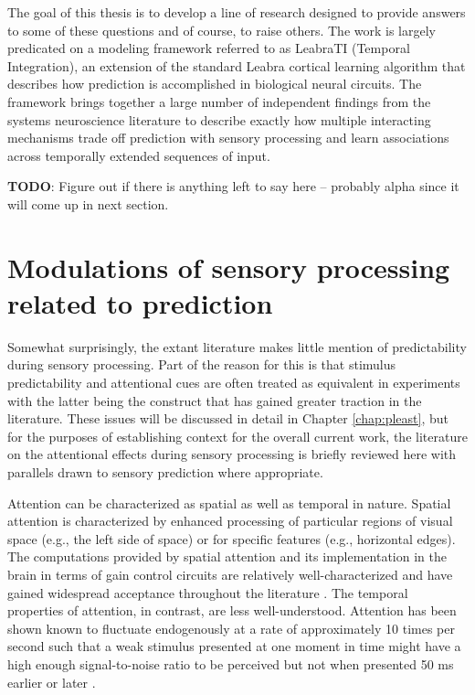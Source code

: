 \documentclass[dwyatte_dissertation.tex]{subfiles}
\begin{document}
{The goal of this thesis is to develop a line of research designed to provide answers to some of these questions and of course, to raise others. The work is largely predicated on a modeling framework referred to as LeabraTI (Temporal Integration), an extension of the standard Leabra cortical learning algorithm \cite{OReillyMunakata00,OReillyMunakataFrankEtAl12} that describes how prediction is accomplished in biological neural circuits. The framework brings together a large number of independent findings from the systems neuroscience literature to describe exactly how multiple interacting mechanisms trade off prediction with sensory processing and learn associations across temporally extended sequences of input. 


\textbf{TODO}: Figure out if there is anything left to say here -- probably alpha since it will come up in next section.

\section{Modulations of sensory processing related to prediction}
Somewhat surprisingly, the extant literature makes little mention of predictability during sensory processing. Part of the reason for this is that stimulus predictability and attentional cues are often treated as equivalent in experiments \cite{SummerfieldEgner09,KokRahnevJeheeEtAl12} with the latter being the construct that has gained greater traction in the literature. These issues will be discussed in detail in Chapter \ref{chap:pleast}, but for the purposes of establishing context for the overall current work, the literature on the attentional effects during sensory processing is briefly reviewed here with parallels drawn to sensory prediction where appropriate.

Attention can be characterized as spatial as well as temporal in nature. Spatial attention is characterized by enhanced processing of particular regions of visual space (e.g., the left side of space) or for specific features (e.g., horizontal edges). The computations provided by spatial attention and its implementation in the brain in terms of gain control circuits are relatively well-characterized and have gained widespread acceptance throughout the literature \cite[see][for comprehensive reviews]{DesimoneDuncan95,ReynoldsChelazzi04}. The temporal properties of attention, in contrast, are less well-understood. Attention has been shown known to fluctuate endogenously at a rate of approximately 10 times per second such that a weak stimulus presented at one moment in time might have a high enough signal-to-noise ratio to be perceived but not when presented 50 ms earlier or later \cite{VanrullenBuschDrewesEtAl11}. 

}
\end{document}
